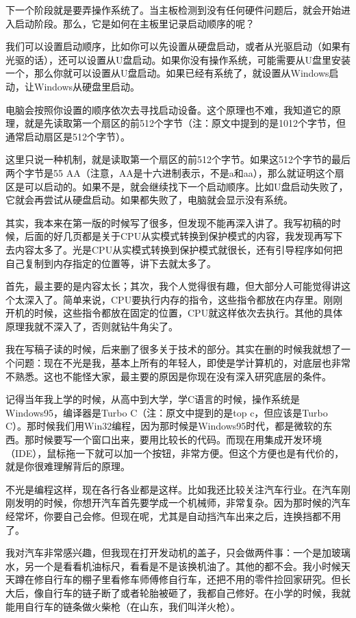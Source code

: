 \documentclass[
  letterpaper,
  DIV=11,
  numbers=noendperiod]{scrreprt}
\begin{document}
下一个阶段就是要弄操作系统了。当主板检测到没有任何硬件问题后，就会开始进入启动阶段。那么，它是如何在主板里记录启动顺序的呢？

我们可以设置启动顺序，比如你可以先设置从硬盘启动，或者从光驱启动（如果有光驱的话），还可以设置从U盘启动。如果你没有操作系统，可能需要从U盘里安装一个，那么你就可以设置从U盘启动。如果已经有系统了，就设置从Windows启动，让Windows从硬盘里启动。

电脑会按照你设置的顺序依次去寻找启动设备。这个原理也不难，我知道它的原理，就是先读取第一个扇区的前512个字节（注：原文中提到的是1012个字节，但通常启动扇区是512个字节）。

这里只说一种机制，就是读取第一个扇区的前512个字节。如果这512个字节的最后两个字节是55
AA（注意，AA是十六进制表示，不是a和aa），那么就证明这个扇区是可以启动的。如果不是，就会继续找下一个启动顺序。比如U盘启动失败了，它就会再尝试从硬盘启动。如果都失败了，电脑就会显示没有系统。

其实，我本来在第一版的时候写了很多，但发现不能再深入讲了。我写初稿的时候，后面的好几页都是关于CPU从实模式转换到保护模式的内容，我发现再写下去内容太多了。光是CPU从实模式转换到保护模式就很长，还有引导程序如何把自己复制到内存指定的位置等，讲下去就太多了。

首先，最主要的是内容太长；其次，我个人觉得很有趣，但大部分人可能觉得讲这个太深入了。简单来说，CPU要执行内存的指令，这些指令都放在内存里。刚刚开机的时候，这些指令都放在固定的位置，CPU就这样依次去执行。其他的具体原理我就不深入了，否则就钻牛角尖了。

我在写稿子读的时候，后来删了很多关于技术的部分。其实在删的时候我就想了一个问题：现在不光是我，基本上所有的年轻人，即使是学计算机的，对底层也非常不熟悉。这也不能怪大家，最主要的原因是你现在没有深入研究底层的条件。

记得当年我上学的时候，从高中到大学，学C语言的时候，操作系统是Windows95，编译器是Turbo
C（注：原文中提到的是top c，但应该是Turbo
C）。那时候我们用Win32编程，因为那时候是Windows95时代，都是微软的东西。那时候要写一个窗口出来，要用比较长的代码。而现在用集成开发环境（IDE），鼠标拖一下就可以加一个按钮，非常方便。但这个方便也是有代价的，就是你很难理解背后的原理。

不光是编程这样，现在各行各业都是这样。比如我还比较关注汽车行业。在汽车刚刚发明的时候，你想开汽车首先要学成一个机械师，非常复杂。因为那时候的汽车经常坏，你要自己会修。但现在呢，尤其是自动挡汽车出来之后，连换挡都不用了。

我对汽车非常感兴趣，但我现在打开发动机的盖子，只会做两件事：一个是加玻璃水，另一个是看看机油标尺，看看是不是该换机油了。其他的都不会。我小时候天天蹲在修自行车的棚子里看修车师傅修自行车，还把不用的零件捡回家研究。但长大后，像自行车的链子断了或者轮胎被砸了，我都自己修好。在小学的时候，我就能用自行车的链条做火柴枪（在山东，我们叫洋火枪）。
\end{document}
